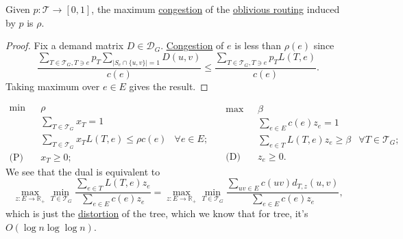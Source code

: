 \begin{lemma}
	Given \(p \colon \mathcal{T} \to [0, 1]\), the maximum \hyperref[def:congestion-of-oblivious-routing]{congestion} of the \hyperref[def:oblivious-routing-scheme]{oblivious routing} induced by \(p\) is \(\rho \).
\end{lemma}
\begin{proof}
	Fix a demand matrix \(D \in \mathcal{D} _G\). \hyperref[def:congestion-of-oblivious-routing]{Congestion} of \(e\) is less than \(\rho (e)\) since
	\[
		\frac{\sum_{T \in \mathcal{T} _G, T \ni e} p_T \sum_{\lvert S_e \cap \{ u, v \} \rvert =1} D(u, v)}{c(e)}
		\leq \frac{\sum_{T \in \mathcal{T} _G, T \ni e} p_T L(T, e)}{c(e)}.
	\]
	Taking maximum over \(e \in E\) gives the result.
\end{proof}

\[
	\begin{aligned}
		\min~           & \rho                                                                      \\
		                & \sum_{T \in \mathcal{T} _G} x_T = 1                                       \\
		                & \sum_{T \in\mathcal{T} _G} x_T L(T, e) \leq \rho c(e) & \forall e \in E ; \\
		\text{(P)}\quad & x_T \geq 0 ;
	\end{aligned}\quad
	\begin{aligned}
		\max~           & \beta                                                                  \\
		                & \sum_{e \in E} c(e) z_e = 1                                            \\
		                & \sum_{e \in T} L(T, e) z_e \geq \beta & \forall T \in \mathcal{T} _G ; \\
		\text{(D)}\quad & z_e \geq 0 .
	\end{aligned}
\]
We see that the dual is equivalent to
\[
	\max _{z \colon E \to \mathbb{R} _+} \min _{T \in \mathcal{T} _G} \frac{\sum_{e \in T} L(T, e) z_e}{\sum_{e \in E} c(e) z_e}
	= \max _{z \colon E \to \mathbb{R} _+} \min _{T \in \mathcal{T} _G} \frac{\sum_{uv \in E} c(uv) d_{T, z}(u, v)}{\sum_{e \in E} c(e) z_e},
\]
which is just the \hyperref[def:distortion]{distortion} of the tree, which we know that for tree, it's \(O(\log n \log \log n)\).